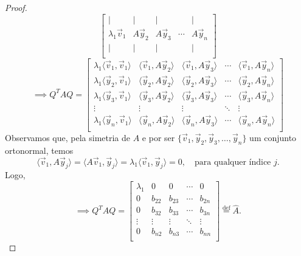 \begin{proof}
\begin{equation}
	\begin{bmatrix}
	| & | & | & & | \\
	\lambda_1 \vec{v}_1 & A \vec{y}_2 & A \vec{y}_3 & \cdots &  A\vec{y}_n \\
	| & | & | & & | \\
	\end{bmatrix}
	\end{equation}
	\begin{equation}
	\implies Q^TAQ =
	\begin{bmatrix}
	\lambda_1\langle \vec{v}_1, \vec{v}_1 \rangle & \langle \vec{v}_1, A\vec{y}_2 \rangle & \langle \vec{v}_1, A\vec{y}_3 \rangle & \cdots & \langle \vec{v}_1, A\vec{y}_n \rangle \\
	\lambda_1\langle \vec{y}_2, \vec{v}_1 \rangle & \langle \vec{y}_2, A\vec{y}_2 \rangle & \langle \vec{y}_2, A\vec{y}_3 \rangle & \cdots & \langle \vec{y}_2, A\vec{y}_n \rangle \\
	\lambda_1\langle \vec{y}_3, \vec{v}_1 \rangle & \langle \vec{y}_3, A\vec{y}_2 \rangle & \langle \vec{y}_3, A\vec{y}_3 \rangle & \cdots & \langle \vec{y}_3, A\vec{y}_n \rangle \\
	\vdots & \vdots & \vdots & \ddots & \vdots \\
	\lambda_1\langle \vec{y}_n, \vec{v}_1 \rangle & \langle \vec{y}_n, A\vec{y}_2 \rangle & \langle \vec{y}_n, A\vec{y}_3 \rangle & \cdots & \langle \vec{y}_n, A\vec{y}_n \rangle \\
	\end{bmatrix}
	\end{equation} Observamos que, pela simetria de $A$ e por ser $	\{ \vec{v}_1, \vec{y}_2, \vec{y}_3, \dots, \vec{y}_n \}$ um conjunto ortonormal, temos
	\begin{equation}
	\langle \vec{v}_1, A\vec{y}_j \rangle = \langle A\vec{v}_1, \vec{y}_j \rangle = \lambda_1 \langle \vec{v}_1, \vec{y}_j \rangle = 0, \quad \text{para qualquer índice } j.
	\end{equation}Logo,
	\begin{equation}
	\implies Q^TAQ =
	\begin{bmatrix}
	\lambda_1 & 0 & 0 & \cdots & 0 \\
	0 & b_{22} & b_{23} & \cdots & b_{2n} \\
	0 & b_{32} & b_{33} & \cdots & b_{3n} \\
	\vdots & \vdots & \vdots & \ddots & \vdots \\
	0 & b_{n2} & b_{n3} & \cdots & b_{nn} \\
	\end{bmatrix} \stackrel{\text{def}}{=} \hat{A}.

\end{equation}
\end{proof}
